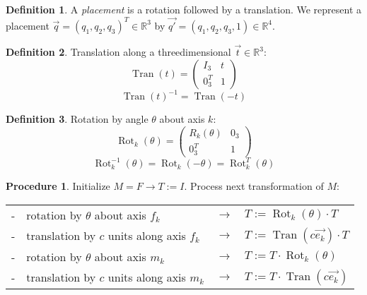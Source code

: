 \documentclass{article}
\theoremstyle{definition}
\newtheorem{definition}{Definition}[section]
\newtheorem{procedure}{Procedure}[section]
\DeclareMathOperator{\Tran}{Tran}
\DeclareMathOperator{\Rot}{Rot}
\begin{document}
\begin{definition}
A \emph{placement} is a rotation followed by a translation. We represent a placement $\vec{q} = (q_1, q_2, q_3)^T \in \mathbb{R}^3$ by $\vec{q'} = (q_1, q_2, q_3, 1) \in \mathbb{R}^4$.
\end{definition}

\begin{definition}
Translation along a threedimensional $\vec{t} \in \mathbb{R}^3$:
\begin{equation*}
\Tran(t) = \begin{pmatrix}
I_3 & t \\
0_3^T & 1
\end{pmatrix}
\end{equation*}
\begin{equation*}
\Tran(t)^{-1} = \Tran(-t)
\end{equation*}
\end{definition}

\begin{definition}
Rotation by angle $\theta$ about axis $k$:
\begin{equation*}
\Rot_k(\theta) = \begin{pmatrix}
R_k(\theta) & 0_3 \\
0_3^T & 1
\end{pmatrix}
\end{equation*}
\begin{equation*}
\Rot_k^{-1}(\theta) = \Rot_k(-\theta) = \Rot_k^T(\theta)
\end{equation*}
\end{definition}

\begin{procedure}
Initialize $M = F \rightarrow T := I$.\newline
Process next transformation of $M$:\newline
\begin{tabular}{rlcl}
- & rotation by $\theta$ about axis $f_k$ & $\rightarrow$ & $T := \Rot_k(\theta) \cdot T$ \\
- & translation by $c$ units along axis $f_k$ & $\rightarrow$ & $T := \Tran(c \vec{e_k}) \cdot T$ \\
- & rotation by $\theta$ about axis $m_k$ & $\rightarrow$ & $T := T \cdot \Rot_k(\theta)$ \\
- & translation by $c$ units along axis $m_k$ & $\rightarrow$ & $T := T \cdot \Tran(c \vec{e_k})$ \\
\end{tabular}
\end{procedure}
\end{document}
